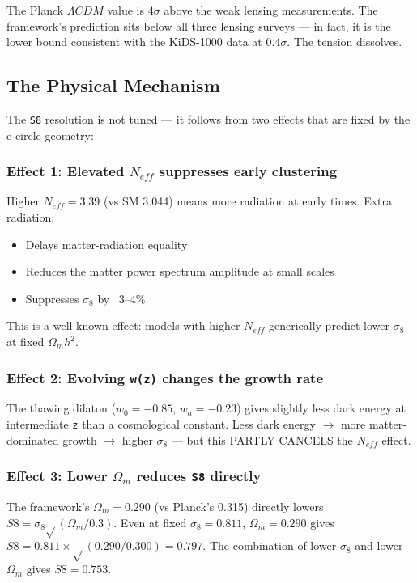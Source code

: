 \documentclass[aps,prd,preprint,superscriptaddress,longbibliography]{revtex4-2}
\begin{document}
The Planck $\Lambda CDM$ value is $4\sigma$ above the weak lensing measurements. The framework's prediction sits below all three lensing surveys --- in fact, it is the lower bound consistent with the KiDS-1000 data at $0.4\sigma$. The tension dissolves.



\subsection{The Physical Mechanism}

The \texttt{S8} resolution is not tuned --- it follows from two effects that are fixed by the e-circle geometry:


\subsubsection{Effect 1: Elevated $N_{eff}$ suppresses early clustering}

Higher $N_{eff} = 3.39$ (vs SM 3.044) means more radiation at early times. Extra radiation:

\begin{itemize}
  \item Delays matter-radiation equality
  \item Reduces the matter power spectrum amplitude at small scales
  \item Suppresses $\sigma_{8}$ by ~3--4\%
\end{itemize}

This is a well-known effect: models with higher $N_{eff}$ generically predict lower $\sigma_{8}$ at fixed $\Omega_m h^{2}$.


\subsubsection{Effect 2: Evolving \texttt{w(z)} changes the growth rate}

The thawing dilaton ($w_{0} = -0.85$, $w_a = -0.23$) gives slightly less dark energy at intermediate \texttt{z} than a cosmological constant. Less dark energy $\to$ more matter-dominated growth $\to$ higher $\sigma_{8}$ --- but this PARTLY CANCELS the $N_{eff}$ effect.


\subsubsection{Effect 3: Lower $\Omega_m$ reduces \texttt{S8} directly}

The framework's $\Omega_m = 0.290$ (vs Planck's 0.315) directly lowers $S8 = \sigma_{8} \sqrt{}(\Omega_m/0.3)$. Even at fixed $\sigma_{8} = 0.811$, $\Omega_m = 0.290$ gives $S8 = 0.811 \times \sqrt{}(0.290/0.300) = 0.797$. The combination of lower $\sigma_{8}$ and lower $\Omega_m$ gives $S8 = 0.753$.
\end{document}
